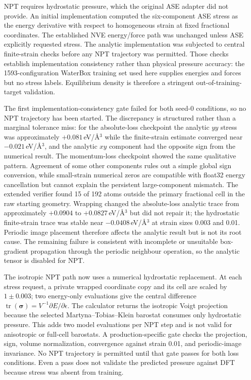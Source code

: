 \documentclass[11pt]{article}
\begin{document}
NPT requires hydrostatic pressure, which the original ASE adapter did not
provide. An initial implementation computed the six-component ASE stress as
the energy derivative with respect to homogeneous strain at fixed fractional
coordinates. The established NVE energy/force path was unchanged unless ASE
explicitly requested stress. The analytic implementation was subjected to
central finite-strain checks before any NPT trajectory was permitted. Those
checks establish implementation consistency rather than physical pressure
accuracy: the 1593-configuration WaterBox training set used here supplies
energies and forces but no stress labels. Equilibrium density is therefore a
stringent out-of-training-target validation.

The first implementation-consistency gate failed for both seed-0 conditions,
so no NPT trajectory has been started. The discrepancy is structured rather
than a marginal tolerance miss: for the absolute-loss checkpoint the
analytic $yy$ stress was approximately $+0.081$\,eV/\AA$^3$ while the
finite-strain estimate converged near $-0.021$\,eV/\AA$^3$, and the analytic
$xy$ component had the opposite sign from the numerical result. The
momentum-loss checkpoint showed the same qualitative pattern. Agreement of
some other components rules out a simple global sign conversion, while
small-strain numerical zeros are compatible with float32 energy
cancellation but cannot explain the persistent large-component mismatch.
The extended verifier found 15 of 192 atoms outside the primary fractional
cell in the raw starting geometry. Wrapping changed the absolute-loss
analytic trace from approximately $+0.0904$ to $+0.0827$\,eV/\AA$^3$ but did
not repair it; the hydrostatic finite-strain trace was stable near
$-0.0408$\,eV/\AA$^3$ at strain sizes 0.003 and 0.01. Periodic image placement
therefore affects the analytic result but is not its root cause. The remaining
failure is consistent with incomplete or unsuitable box-gradient propagation
through the periodic neighbour operation, so the analytic tensor is disabled
for NPT.

The isotropic NPT path now uses a numerical hydrostatic replacement. At each
stress request, a private wrapped coordinate copy and its cell are scaled by
$1\pm0.003$; two energy-only evaluations give the central difference
$\operatorname{tr}(\boldsymbol{\sigma})=V^{-1}\partial E/\partial\epsilon$.
The calculator returns the isotropic Voigt projection because the selected
Martyna--Tobias--Klein barostat consumes only hydrostatic pressure. This adds
two model evaluations per NPT step and is not valid for anisotropic or
full-cell barostats. A production-specific gate checks the projection, sign,
volume normalization, convergence against strain 0.01, and periodic-image
invariance. No NPT trajectory is permitted until that gate passes for both
loss conditions. Even a pass does not validate the predicted pressure against
DFT because stress was absent from training.
\end{document}
